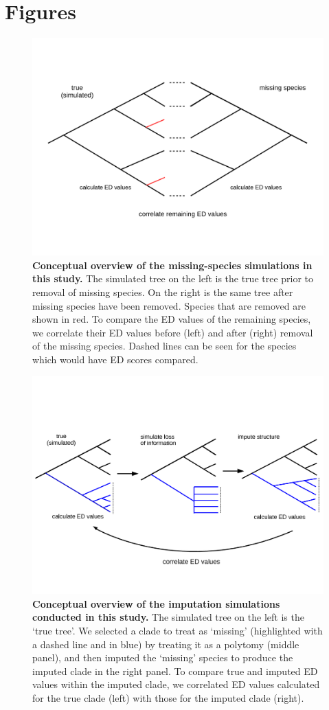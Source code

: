 \documentclass[10pt,english]{article}
\begin{document}
\clearpage

\section*{Figures}

\begin{figure}[!ht]
  \center
  \includegraphics[width=.75\textwidth]{../figures/missingSpecies.png}
  \caption{\textbf{Conceptual overview of the missing-species simulations in
  this study.} The simulated tree on the left is the true tree prior to removal
  of missing species. On the right is the same tree after missing species have
  been removed. Species that are removed are shown in red. To compare the ED
  values of the remaining species, we correlate their ED values before (left)
  and after (right) removal of the missing species. Dashed lines can be seen for
  the species which would have ED scores compared.}
  \label{missingSpecies}
\end{figure}

\begin{figure}[!ht]
  \center
  \includegraphics[width=.75\textwidth]{../figures/imputeConcept.png}
  \caption{\textbf{Conceptual overview of the imputation simulations conducted
  in this study.} The simulated tree on the left is the ‘true tree'. We selected
  a clade to treat as ‘missing' (highlighted with a dashed line and in blue) by
  treating it as a polytomy (middle panel), and then imputed the ‘missing'
  species to produce the imputed clade in the right panel. To compare true and
  imputed ED values within the imputed clade, we correlated ED values calculated
  for the true clade (left) with those for the imputed clade (right).}
  \label{imputeConcept}
\end{figure}
\end{document}
